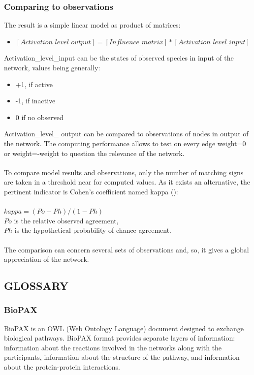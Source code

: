 \subsubsection{Comparing to observations}
The result is a simple linear model as product of matrices:
\begin{itemize}
\item $[Activation\_level\_ output] = [Influence\_matrix] * [Activation\_level\_input]$
\end{itemize}
Activation\_level\_input can be the states of observed species in input of the network, values being generally:
\begin{itemize}
\item +1, if active
\item -1, if inactive
\item 0 if no observed
\end{itemize}
Activation\_level\_ output can be compared to observations of nodes in output of the network. The computing performance allows to test on every edge weight=0 or weight=-weight to question the relevance of the network.\\\\
To compare model results and observations, only the number of matching signs are taken in a threshold near for computed values. As it exists an alternative, the pertinent indicator is Cohen's coefficient named kappa (\cite{Kappa}):\\\\
\hspace*{1cm}$kappa=(Po-Ph)/(1-Ph)$ \\
\hspace*{1cm}$Po$ is the relative observed agreement,\\
\hspace*{1cm}$Ph$ is the hypothetical probability of chance agreement.\\\\
The comparison can concern several sets of observations and, so, it gives a global appreciation of the network.

\subsection{GLOSSARY}\label{GLOSSARY}
\subsubsection{BioPAX}
BioPAX is an OWL (Web Ontology Language) document designed to exchange biological pathways. BioPAX format provides separate layers of information: information about the reactions involved in the networks along with the participants, information about the structure of the pathway, and information about the protein-protein interactions. 
